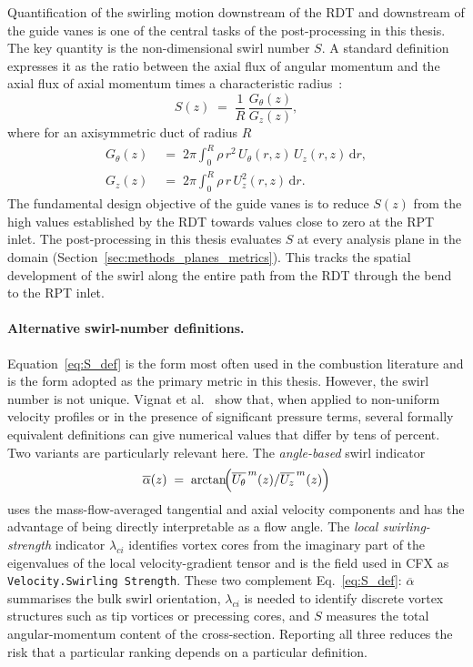 Quantification of the swirling motion downstream of the RDT and downstream of the guide vanes is one of the central tasks of the post-processing in this thesis. The key quantity is the non-dimensional swirl number $S$. A standard definition expresses it as the ratio between the axial flux of angular momentum and the axial flux of axial momentum times a characteristic radius~\cite{Gupta1984, Vignat2022}:
\begin{equation}
S(z) \;=\; \frac{1}{R}\,\frac{G_\theta(z)}{G_z(z)},
\label{eq:S_def}
\end{equation}
where for an axisymmetric duct of radius $R$
\begin{align}
G_\theta(z) \;&=\; 2\pi\!\int_0^R \rho\, r^2 \, U_\theta(r,z)\,U_z(r,z)\,\mathrm{d}r,
\label{eq:Gtheta}\\
G_z(z) \;&=\; 2\pi\!\int_0^R \rho\, r \, U_z^{2}(r,z)\,\mathrm{d}r.
\label{eq:Gz}
\end{align}
The fundamental design objective of the guide vanes is to reduce $S(z)$ from the high values established by the RDT towards values close to zero at the RPT inlet. The post-processing in this thesis evaluates $S$ at every analysis plane in the domain (Section~\ref{sec:methods_planes_metrics}). This tracks the spatial development of the swirl along the entire path from the RDT through the bend to the RPT inlet.
 
\paragraph{Alternative swirl-number definitions.}
Equation~\ref{eq:S_def} is the form most often used in the combustion literature and is the form adopted as the primary metric in this thesis. However, the swirl number is not unique. Vignat et al.~\cite{Vignat2022} show that, when applied to non-uniform velocity profiles or in the presence of significant pressure terms, several formally equivalent definitions can give numerical values that differ by tens of percent. Two variants are particularly relevant here. The \emph{angle-based} swirl indicator
\begin{equation}
\overline{\alpha}(z) \;=\; \arctan\!\Bigl(\overline{U_\theta}^{\,m}(z)/\overline{U_z}^{\,m}(z)\Bigr)
\label{eq:alpha_bar}
\end{equation}
uses the mass-flow-averaged tangential and axial velocity components and has the advantage of being directly interpretable as a flow angle. The \emph{local swirling-strength} indicator $\lambda_{ci}$ identifies vortex cores from the imaginary part of the eigenvalues of the local velocity-gradient tensor and is the field used in CFX as \texttt{Velocity.Swirling Strength}. These two complement Eq.~\ref{eq:S_def}: $\overline{\alpha}$ summarises the bulk swirl orientation, $\lambda_{ci}$ is needed to identify discrete vortex structures such as tip vortices or precessing cores, and $S$ measures the total angular-momentum content of the cross-section. Reporting all three reduces the risk that a particular ranking depends on a particular definition.
 
